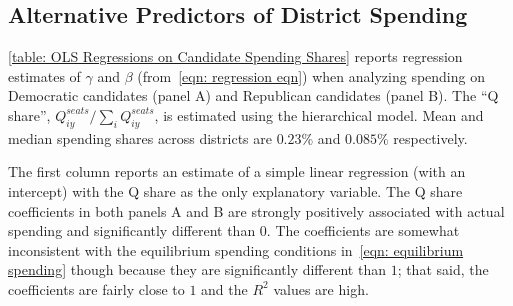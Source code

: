 \documentclass[12pt,final,fleqn]{article}
\theoremstyle{plain}
\begin{document}
\subsection{Alternative Predictors of District Spending}
\autoref{table: OLS Regressions on Candidate Spending Shares} reports regression estimates of $\gamma$ and $\beta$ (from~\autoref{eqn: regression eqn}) when analyzing spending on Democratic candidates (panel A) and Republican candidates (panel B). The ``Q share'', $Q_{iy}^{seats}/ \sum_i Q_{iy}^{seats}$, is estimated using the hierarchical model. Mean and median spending shares across districts are $0.23\%$ and $0.085\%$ respectively. 

The first column reports an estimate of a simple linear regression (with an intercept) with the Q share as the only explanatory variable. The Q share coefficients in both panels A and B are strongly positively associated with actual spending and significantly different than $0$. The coefficients are somewhat inconsistent with the equilibrium spending conditions in~\autoref{eqn: equilibrium spending} though because they are significantly different than $1$; that said, the coefficients are fairly close to $1$ and the $R^2$ values are high.
\end{document}
